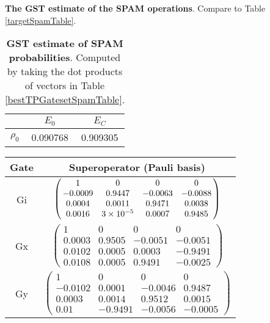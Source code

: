 {\begin{table}[h]
\begin{center}
\caption{\textbf{The GST estimate of the SPAM operations}.  Compare to Table \ref{targetSpamTable}.\label{bestTPGatesetSpamTable}}
\end{center}
\end{table}

\begin{table}[h]
\begin{center}
\begin{tabular}[l]{|c|c|c|}
\hline
 & $E_{0}$ & $E_C$ \\ \hline
$\rho_{0}$ & 0.090768 & 0.909305 \\ \hline
\end{tabular}

\caption{\textbf{GST estimate of SPAM probabilities}.  Computed by taking the dot products of vectors in Table \ref{bestTPGatesetSpamTable}.\label{bestTPGatesetSpamParametersTable}}
\end{center}
\end{table}

\begin{table}[h]
\begin{center}
\begin{tabular}[l]{|c|c|}
\hline
Gate & Superoperator (Pauli basis) \\ \hline
Gi & $ \left(\!\!\begin{array}{cccc}
1 & 0 & 0 & 0 \\ 
-0.0009 & 0.9447 & -0.0063 & -0.0088 \\ 
0.0004 & 0.0011 & 0.9471 & 0.0038 \\ 
0.0016 & 3\times 10^{-5} & 0.0007 & 0.9485
 \end{array}\!\!\right) $
 \\ \hline
Gx & $ \left(\!\!\begin{array}{cccc}
1 & 0 & 0 & 0 \\ 
0.0003 & 0.9505 & -0.0051 & -0.0051 \\ 
0.0102 & 0.0005 & 0.0003 & -0.9491 \\ 
0.0108 & 0.0005 & 0.9491 & -0.0025
 \end{array}\!\!\right) $
 \\ \hline
Gy & $ \left(\!\!\begin{array}{cccc}
1 & 0 & 0 & 0 \\ 
-0.0102 & 0.0001 & -0.0046 & 0.9487 \\ 
0.0003 & 0.0014 & 0.9512 & 0.0015 \\ 
0.01 & -0.9491 & -0.0056 & -0.0005
 \end{array}\!\!\right) $
 \\ \hline
\end{tabular}


\end{center}
\end{table}}
